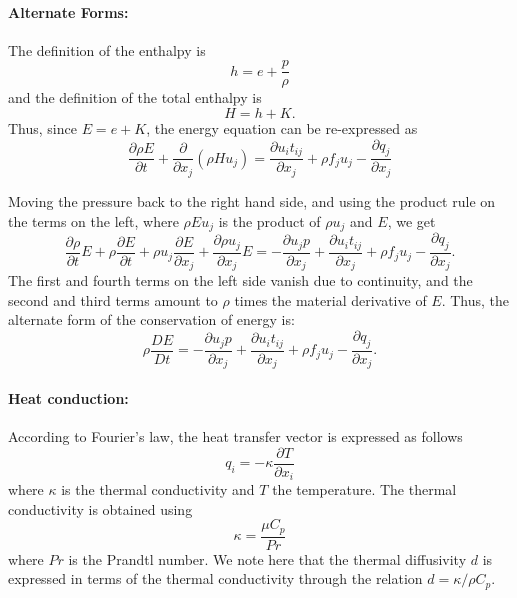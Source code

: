\documentclass[oneside,a4paper,11pt]{report}
\begin{document}
\paragraph{Alternate Forms:}
The definition of the enthalpy is 
\begin{equation}
h = e + \frac{p}{\rho}
\end{equation}
and the definition of the total enthalpy is
\begin{equation}
    H = h + K.
\end{equation}
Thus, since $E = e + K$, the energy equation can be re-expressed as
\begin{equation}
\frac{\partial \rho E}{\partial t} + \frac{\partial}{\partial x_j} \left ( \rho H u_j \right ) = \frac{\partial u_i t_{ij}}{\partial x_j} + \rho f_j u_j - \frac{\partial q_j}{\partial x_j}
\end{equation}

Moving the pressure back to the right hand side, and using the product rule on the terms on the left, where $\rho E u_j$ is the product of $\rho u_j$ and $E$, we get
\begin{equation}
\frac{\partial \rho}{\partial t}E + \rho\frac{\partial E}{\partial t} + \rho u_j\frac{\partial E}{\partial x_j}+\frac{\partial \rho u_j}{\partial x_j}E = -\frac{\partial u_j p}{\partial x_j} +  \frac{\partial u_i t_{ij}}{\partial x_j} + \rho f_j u_j - \frac{\partial q_j}{\partial x_j}.
\end{equation}
The first and fourth terms on the left side vanish due to continuity, and the second and third terms amount to $\rho$ times the material derivative of $E$. Thus, the alternate form of the conservation of energy is:
\begin{equation}
\label{eq:diff_cons_energy}
\rho\frac{DE}{Dt} = -\frac{\partial u_j p}{\partial x_j} + \frac{\partial u_i t_{ij}}{\partial x_j} + \rho f_j u_j - \frac{\partial q_j}{\partial x_j}.
\end{equation}

\paragraph{Heat conduction:}
According to Fourier's law, the heat transfer vector is expressed as follows
\begin{equation} 
\label{eq:heat_conduction}
q_i = -\kappa \frac{\partial T}{\partial x_i}
\end{equation}
where $\kappa$ is the thermal conductivity and $T$ the temperature. The thermal conductivity is obtained using
\begin{equation}
\kappa = \frac{\mu C_p}{Pr}
\end{equation}
where $Pr$ is the Prandtl number. We note here that the thermal diffusivity $d$ is expressed in terms of the thermal conductivity through the relation $d = \kappa/ \rho C_p$. 
\end{document}

